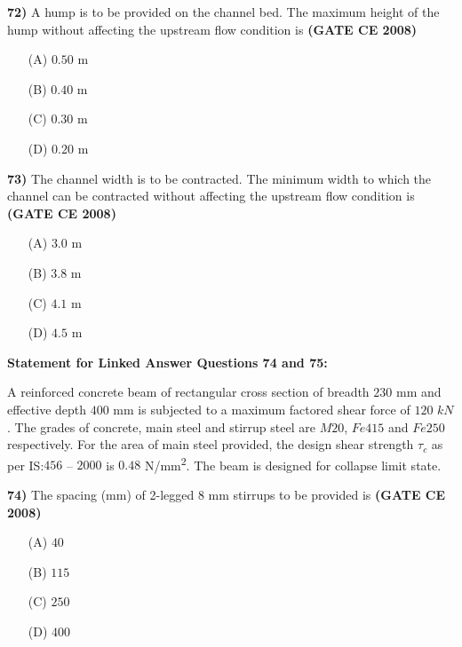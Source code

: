 \documentclass[journal]{IEEEtran}
\begin{document}
\begin{enumerate}
\vspace{0.3cm}

\textbf{72)} \quad A hump is to be provided on the channel bed. The maximum height of the hump without affecting the upstream flow condition is \textbf{(GATE CE 2008)}

\begin{itemize}
    \item[(A)] $0.50$ m
    \item[(B)] $0.40$ m
    \item[(C)] $0.30$ m
    \item[(D)] $0.20$ m
\end{itemize}

\vspace{0.3cm}

\textbf{73)} \quad The channel width is to be contracted. The minimum width to which the channel can be contracted without affecting the upstream flow condition is \textbf{(GATE CE 2008)}

\begin{itemize}
    \item[(A)] $3.0$ m
    \item[(B)] $3.8$ m
    \item[(C)] $4.1$ m
    \item[(D)] $4.5$ m
\end{itemize}

\vspace{1cm}

\textbf{Statement for Linked Answer Questions 74 and 75:}

A reinforced concrete beam of rectangular cross section of breadth $230$ mm and effective depth $400$ mm is subjected to a maximum factored shear force of $120$ $kN$. The grades of concrete, main steel and stirrup steel are $M20$, $Fe415$ and $Fe250$ respectively. For the area of main steel provided, the design shear strength $\tau_c$ as per IS:$456$ --  $2000$ is $0.48$ N/mm\textsuperscript{2}. The beam is designed for collapse limit state.

\vspace{0.5cm}

\textbf{74)} \hspace{0.2cm} The spacing (mm) of 2-legged 8 mm stirrups to be provided is \textbf{(GATE CE 2008)}
\begin{itemize}
  \item[(A)] $40$
  \item[(B)] $115$
  \item[(C)] $250$
  \item[(D)] $400$
\end{itemize}


\end{enumerate}
\end{document}

